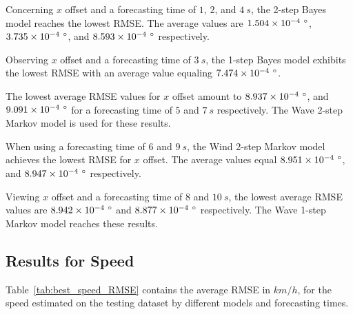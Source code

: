 \documentclass[preprint,12pt]{elsarticle}
\begin{document}
Concerning $x$ offset and a forecasting time of $1$, $2$, and $4 \ s$, the 2-step Bayes model reaches the lowest RMSE. The average values are $1.504 \times 10^{-4} \ \degree$, $3.735 \times 10^{-4} \ \degree$, and $8.593 \times 10^{-4} \ \degree$ respectively.

Observing $x$ offset and a forecasting time of $3 \ s$, the 1-step Bayes model exhibits the lowest RMSE with an average value equaling $7.474 \times 10^{-4} \ \degree$.

The lowest average RMSE values for $x$ offset amount to $8.937 \times 10^{-4} \ \degree$, and $9.091 \times 10^{-4} \ \degree$ for a forecasting time of $5$ and $7 \ s$ respectively. The Wave 2-step Markov model is used for these results.

When using a forecasting time of $6$ and $9 \ s$, the Wind 2-step Markov model achieves the lowest RMSE for $x$ offset. The average values equal $8.951 \times 10^{-4} \ \degree$, and $8.947 \times 10^{-4} \ \degree$ respectively.

Viewing $x$ offset and a forecasting time of $8$ and $10 \ s$, the lowest average RMSE values are $8.942 \times 10^{-4} \ \degree$ and $8.877 \times 10^{-4} \ \degree$ respectively. The Wave 1-step Markov model reaches these results.

\subsection{Results for Speed}

Table~\ref{tab:best_speed_RMSE} contains the average RMSE in $km/h$, for the speed estimated on the testing dataset by different models and forecasting times.
\end{document}
